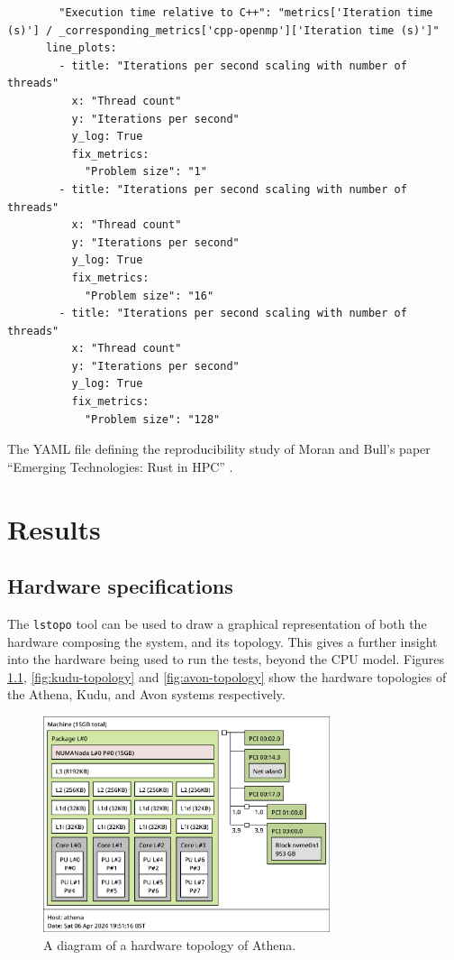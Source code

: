 \begin{code}
\begin{verbatim}
        "Execution time relative to C++": "metrics['Iteration time (s)'] / _corresponding_metrics['cpp-openmp']['Iteration time (s)']"
      line_plots:
        - title: "Iterations per second scaling with number of threads"
          x: "Thread count"
          y: "Iterations per second"
          y_log: True
          fix_metrics:
            "Problem size": "1"
        - title: "Iterations per second scaling with number of threads"
          x: "Thread count"
          y: "Iterations per second"
          y_log: True
          fix_metrics:
            "Problem size": "16"
        - title: "Iterations per second scaling with number of threads"
          x: "Thread count"
          y: "Iterations per second"
          y_log: True
          fix_metrics:
            "Problem size": "128"
    \end{verbatim}
    \caption{The YAML file defining the reproducibility study of Moran and Bull's paper ``Emerging Technologies: Rust in HPC'' \cite{moranEmergingTechnologiesRust2023}.}
    \label{listing:replication-study-yaml-file}
\end{code}





\chapter{Results}
\label{ch:results-appendix}

\section{Hardware specifications}
\label{sec:hardware-specifications}

The \texttt{lstopo} tool can be used to draw a graphical representation of both the hardware composing the system, and its topology. This gives a further insight into the hardware being used to run the tests, beyond the CPU model. Figures \ref{fig:athena-topology}, \ref{fig:kudu-topology} and \ref{fig:avon-topology} show the hardware topologies of the Athena, Kudu, and Avon systems respectively.

\begin{figure}[H]
    \centering
    \includegraphics[width=0.75\textwidth]{images/8_appendix/athena-topology.png}
    \caption{A diagram of a hardware topology of Athena.}
    \label{fig:athena-topology}
\end{figure}

